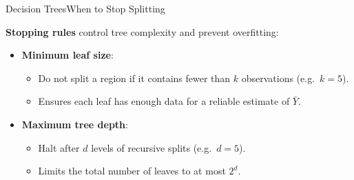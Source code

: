 \documentclass[dvipsnames,hyperref={pdfpagelabels=false}]{beamer}
\begin{document}
\begin{frame}{Decision Trees}{When to Stop Splitting}

\textbf{Stopping rules} control tree complexity and prevent overfitting:
\vspace{0.3cm}
\begin{itemize}
  \item \textbf{Minimum leaf size}: 
  \begin{itemize}
    \vspace{0.2cm}
\item  Do not split a region if it contains fewer than $k$ observations (e.g.\ $k = 5$). 
     \vspace{0.05cm}
    \item  Ensures each leaf has enough data for a reliable estimate of $\bar{Y}$.
  \end{itemize}
  \vspace{0.2cm}
  \item \textbf{Maximum tree depth}:
  \begin{itemize}
    \vspace{0.2cm}

    \item Halt after $d$ levels of recursive splits (e.g.\ $d = 5$). 
      \vspace{0.2cm}

    \item Limits the total number of leaves to at most $2^d$.
  \end{itemize}
\end{itemize}

\end{frame}
\end{document}
